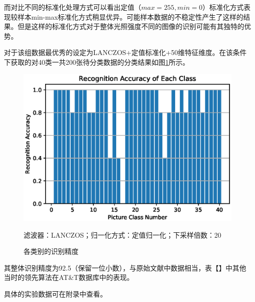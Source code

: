 \documentclass[UTF8]{ctexart}
\begin{document}
而对比不同的标准化处理方式可以看出定值（\(max=255,min=0\)）标准化方式表现较样本min-max标准化方式稍显优异。可能样本数据的不稳定性产生了这样的结果。但是这样的标准化方式对于整体光照强度不同的图像的识别可能有其独特的优势。\par
对于该组数据最优秀的设定为LANCZOS+定值标准化+50维特征维度。在该条件下获取的对40类一共200张待分类数据的分类结果如图\ref{fig-result_class_accuracy}所示。\par
\begin{figure}[h]
    \centering
    \includegraphics[scale = 0.6]{RA_Class.eps}
    \caption{各类别的识别精度}{滤波器：LANCZOS；归一化方式：定值归一化；下采样倍数：20}\label{fig-result_class_accuracy}
\end{figure}
其整体识别精度为92.5（保留一位小数），与原始文献中数据相当，表【】中其他当时的领先算法在AT\&T数据库中的表现。\par
具体的实验数据可在附录中查看。
\end{document}
